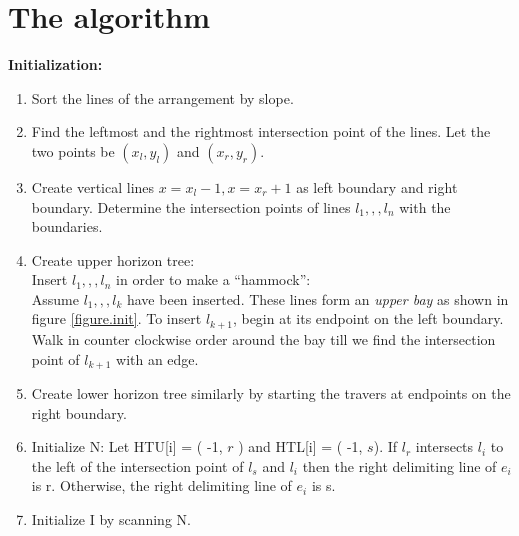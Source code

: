 \documentclass[12pt]{article}
\begin{document}
        \newpage


        \section{The algorithm} %
        \label{sec:algo}

        {\bf Initialization:}

        \begin{enumerate}
            \item  Sort the lines of the arrangement by slope.
            \item  Find the leftmost and the rightmost intersection point of the
                lines.
                Let the two points be $(x_{l},y_{l})$ and $(x_{r},y_{r})$.
            \item Create vertical lines $x = x_{l} - 1 , x = x_{r} + 1 $ as left
                boundary and right boundary.
                Determine the intersection points of  lines $l_{1}, , , l_{n}$
                with the boundaries.
            \item Create upper horizon tree:\\
                Insert $l_{1}, , , l_{n}$ in order to make a ``hammock'': \\
                Assume $l_{1}, , , l_{k}$ have been inserted. These lines form
                an {\em upper bay} as shown in figure \ref{figure.init}. To insert
                $l_{k+1}$, begin at its endpoint on the left boundary. Walk in
                counter clockwise order around the bay till we find the
                intersection point of $l_{k+1}$ with an edge.
            \item Create lower horizon tree similarly by starting the travers at
                endpoints on the right boundary.
            \item Initialize N:
                Let HTU[i] = ( -1, $r$ ) and HTL[i] = ( -1, $s$).  If $l_{r}$
                intersects $l_{i}$ to the left of the intersection point of
                $l_{s}$ and $l_{i}$ then the right delimiting line of $e_{i}$
                is r. Otherwise, the right delimiting line of $e_{i}$ is s.
            \item Initialize I by scanning N.
        \end{enumerate}
\end{document}

